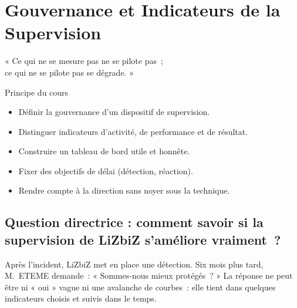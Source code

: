 
\chapter{Gouvernance et Indicateurs de la Supervision}
\label{chap:gouvernance}

\epigraph{%
    « Ce qui ne se mesure pas ne se pilote pas~;\\
    ce qui ne se pilote pas se dégrade. »%
}{Principe du cours}


\begin{boxobjectifs}
\begin{itemize}
    \item Définir la gouvernance d'un dispositif de supervision.
    \item Distinguer indicateurs d'activité, de performance et de résultat.
    \item Construire un tableau de bord utile et honnête.
    \item Fixer des objectifs de délai (détection, réaction).
    \item Rendre compte à la direction sans noyer sous la technique.
\end{itemize}
\end{boxobjectifs}

\bigskip

\section*{Question directrice : comment savoir si la supervision de LiZbiZ s'améliore vraiment~?}

Après l'incident, LiZbiZ met en place une détection. Six mois plus tard,
M.~ETEME demande~: « Sommes-nous mieux protégés~? » La réponse ne peut être
ni « oui » vague ni une avalanche de courbes~: elle tient dans quelques
indicateurs choisis et suivis dans le temps.


